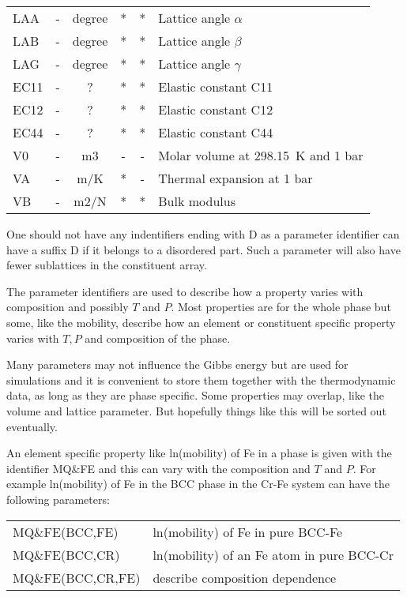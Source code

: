 \documentclass[12pt]{article}
\begin{document}
\begin{tabular}{lccccl}
LAA   & - &degree& * & * & Lattice angle $\alpha$\\
LAB   & - &degree& * & * & Lattice angle $\beta$\\
LAG   & - &degree& * & * & Lattice angle $\gamma$\\
EC11  & - & ? &* & * & Elastic constant C11\\
EC12  & - & ? &* & * & Elastic constant C12\\
EC44  & - & ? &* & * & Elastic constant C44\\
V0    & - & m3 &- & - & Molar volume at 298.15~K and 1 bar\\
VA    & - & m/K & * & - & Thermal expansion at 1 bar\\
VB    & - & m2/N & * & * &Bulk modulus\\\hline
\end{tabular}

\bigskip

One should not have any indentifiers ending with D as a parameter
identifier can have a suffix D if it belongs to a disordered part.
Such a parameter will also have fewer sublattices in the constituent
array.

The parameter identifiers are used to describe how a property varies
with composition and possibly $T$ and $P$.  Most properties are for
the whole phase but some, like the mobility, describe how an element
or constituent specific property varies with $T, P$ and composition of
the phase.

Many parameters may not influence the Gibbs energy but are used for
simulations and it is convenient to store them together with the
thermodynamic data, as long as they are phase specific.  Some
properties may overlap, like the volume and lattice parameter.  But
hopefully things like this will be sorted out eventually.

An element specific property like ln(mobility) of Fe in a phase is
given with the identifier MQ\&FE and this can vary with the
composition and $T$ and $P$.  For example ln(mobility) of Fe in the
BCC phase in the Cr-Fe system can have the following parameters:

\begin{tabular}{ll}
MQ\&FE(BCC,FE) & ln(mobility) of Fe in pure BCC-Fe\\
MQ\&FE(BCC,CR) & ln(mobility) of an Fe atom in pure BCC-Cr\\
MQ\&FE(BCC,CR,FE) & describe composition dependence\\
\end{tabular}
\end{document}
